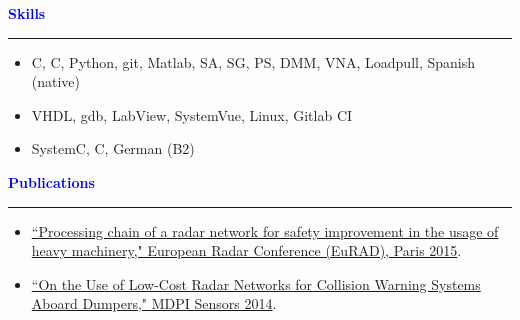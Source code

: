 \documentclass[10pt, letterpaper]{letter}
\def\myplus{\hspace{-.3em}\raisebox{.4ex}{ \tiny +}}
\def\cpp{C\myplus\myplus}
\def\csharp{C\nolinebreak[4]\hspace{-.3em}\raisebox{.25ex}{ \small \#}}
\def\sa{\raisebox{-.4ex}{\FilledSmallCircle\FilledSmallCircle\FilledSmallCircle\FilledSmallCircle\FilledSmallCircle}}
\def\sb{\raisebox{-.4ex}{\FilledSmallCircle\FilledSmallCircle\FilledSmallCircle\FilledSmallCircle\SmallCircle}}
\def\sc{\raisebox{-.4ex}{\FilledSmallCircle\FilledSmallCircle\FilledSmallCircle\SmallCircle\SmallCircle}}
\begin{document}
\begin{minipage}[t]{.47\linewidth}
    \textcolor{Blue}{
        \large\textbf{Skills}
        \vspace{3pt}
        \hrule height 1.5pt
        \vspace{6pt}
    }
    \begin{itemize}[leftmargin=5.3em]
        \item[\sa] C, \cpp, Python, git, Matlab, SA, SG, PS, DMM, VNA, Loadpull, Spanish (native)
        \item[\sb] VHDL, gdb, LabView, SystemVue, Linux, Gitlab CI
        \item[\sc] SystemC, \csharp, German (B2)
    \end{itemize}
\end{minipage}
\hfill
\begin{minipage}[t]{.51\linewidth}
    \textcolor{Blue}{
        \large\textbf{Publications}
        \vspace{3pt}
        \hrule height 1.5pt
        \vspace{6pt}
    }
    \begin{itemize}[label=--,leftmargin=1em]
        \item \href{http://ieeexplore.ieee.org/xpl/login.jsp?tp=&arnumber=7346261&url=http\%3A\%2F\%2Fieeexplore.ieee.org\%2Fxpls\%2Fabs\_all.jsp\%3Farnumber\%3D7346261}{``Processing chain of a radar network for safety improvement in the usage of heavy machinery," European Radar Conference (EuRAD), Paris 2015}.
        \item \href{http://www.mdpi.com/1424-8220/14/3/3921}{``On the Use of Low-Cost Radar Networks for Collision Warning Systems Aboard Dumpers," MDPI Sensors 2014}.
    \end{itemize}
\end{minipage}

\vfill
\end{document}

